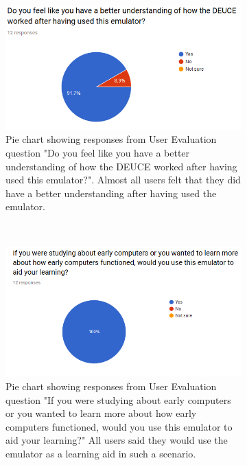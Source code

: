 \documentclass{l4proj}
\begin{document}
\begin{figure}[t]
	\centering
	\begin{subfigure}[t]{0.45\textwidth}
		\includegraphics[width=\textwidth]{images/chart-5}
		\caption{Pie chart showing responses from User Evaluation question "Do you feel like you have a better understanding of how the DEUCE worked after having used this emulator?". Almost all users felt that they did have a better understanding after having used the emulator.}
		\label{fig:chart-5}
	\end{subfigure}
	~ %
	\begin{subfigure}[t]{0.45\textwidth}
		\includegraphics[width=\textwidth]{images/chart-6}
		\caption{Pie chart showing responses from User Evaluation question "If you were studying about early computers or you wanted to learn more about how early computers functioned, would you use this emulator to aid your learning?" All users said they would use the emulator as a learning aid in such a scenario.}
		\label{fig:chart-6}
	\end{subfigure}
	\begin{subfigure}[t]{0.45\textwidth}

\end{subfigure}
\end{figure}
\end{document}
